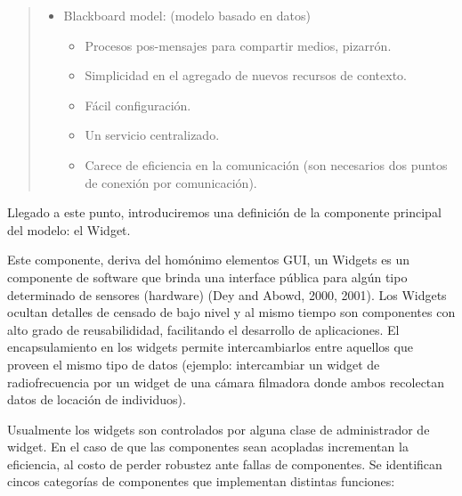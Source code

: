 \begin{quotation}
\begin{itemize}
\item Blackboard model: (modelo basado en datos) 	
	\begin{itemize}
	\item  Procesos pos-mensajes para compartir medios, pizarrón.
	\item Simplicidad en el agregado de nuevos recursos de contexto.
	\item Fácil configuración.
	\item Un servicio centralizado.
	\item Carece de eficiencia en la comunicación (son necesarios dos puntos
	de conexión por comunicación). 
	\end{itemize}

\end{itemize}                                
\end{quotation} 


Llegado a este punto, introduciremos una definición de la componente
principal del modelo: el Widget.


Este componente, deriva del homónimo elementos GUI, un Widgets es un componente de software que brinda una interface pública para algún tipo determinado de sensores (hardware) (Dey and Abowd, 2000, 2001). Los Widgets ocultan detalles de censado de bajo nivel y al mismo tiempo son componentes con alto grado de reusabilididad, facilitando el desarrollo de aplicaciones. El encapsulamiento en los widgets permite intercambiarlos entre aquellos que proveen el mismo tipo de datos (ejemplo: intercambiar un widget de radiofrecuencia por un widget de una cámara filmadora donde ambos recolectan datos de locación de individuos).


Usualmente los widgets son controlados por alguna clase de administrador de widget.
En el caso de que las componentes sean acopladas incrementan la eficiencia, al costo de perder robustez ante fallas de componentes. Se identifican cincos categorías de componentes que implementan distintas funciones:

